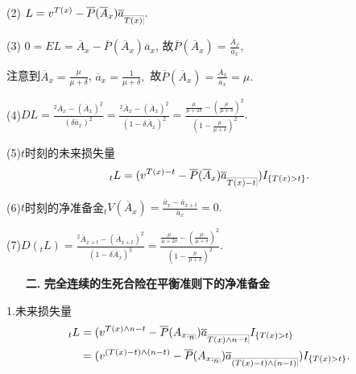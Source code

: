 \documentclass[a4paper,10pt]{ctexbook}
\makeatletter
\newcommand{\hei}{\CJKfamily{hei}}      %
\DeclareRobustCommand{\annu}[1]{_{%
    \def\arraystretch{0}%
    \setlength\arraycolsep{1pt}%
    \setlength\arrayrulewidth{.2pt}%
    \begin{array}[b]{@{}c|}\hline
        \\[\arraycolsep]%
        \scriptstyle #1%
    \end{array}%
}}
\makeatother
\begin{document}
(2) $L=v^{T(x)}-\overline P(\overline A_x)\overline a_{\annu {T(x)}}.$

(3) $0=EL=\overline A_x-\overline P(\overline A_x)\overline a_x$, 故$\overline P(\overline A_x)=\frac{\overline A_x}{\overline a_x},$

注意到$\overline A_x=\frac{\mu}{\mu+\delta}$, $\overline a_x=\frac{1}{\mu+\delta},$
故$\overline P(\overline A_x)=\frac{\overline A_x}{\overline a_x}=\mu.$

(4)$DL=\frac{^2\overline A_{x}-(\overline A_{x})^2}{(\delta\overline a_x)^2}=\frac{^2\overline A_{x}-(\overline A_{x})^2}{(1-\delta\overline A_x)^2}=\frac{\frac{\mu}{\mu+2\delta}-(\frac{\mu}{\mu+\delta})^2}{(1-\frac{\mu}{\mu+\delta})^2}.$

(5)$t$时刻的未来损失量
$${}_tL=(v^{T(x)-t}-\overline{P}( \overline{A}_x )\overline a_{\annu {T(x)-t}})I_{\{T(x)>t\}}.$$

(6)$t$时刻的净准备金$ {}_tV(\overline A_x)=\frac{\overline a_{x}-\overline a_{x+t}}{\overline a_x}=0.$

(7)$D({}_tL)=\frac{^2\overline A_{x+t}-(\overline A_{x+t})^2}{(1-\delta\overline A_x)^2}=\frac{\frac{\mu}{\mu+2\delta}-(\frac{\mu}{\mu+\delta})^2}{(1-\frac{\mu}{\mu+\delta})^2}.$
\begin{itemize}
    \item[{\bf\hei 二.}]{\bf\hei 完全连续的生死合险在平衡准则下的净准备金}
\end{itemize}



1.未来损失量
\begin{align*}
    _tL & =(v^{T(x)\land n-t}-\overline P(A_{x:\annu n})\overline{a}_{\annu {T(x)\land n-t}}I_{\{T(x)>t\}}             \\
        & =(v^{(T(x)-t)\land(n-t)}-\overline P(A_{x:\annu n})\overline{a}_{\annu {(T(x)-t)\land(n-t)}})I_{\{T(x)>t\}}. \\
\end{align*}
\end{document}
